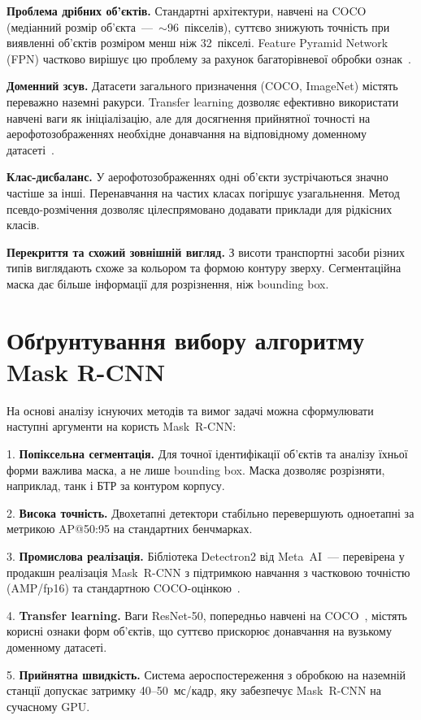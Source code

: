 \documentclass[14pt,a4paper]{extreport}
\begin{document}
\textbf{Проблема дрібних об'єктів.} Стандартні архітектури, навчені на
COCO (медіанний розмір об'єкта~---~$\sim$96~пікселів), суттєво знижують
точність при виявленні об'єктів розміром менш ніж 32~пікселі. Feature
Pyramid Network (FPN) частково вирішує цю проблему за рахунок
багаторівневої обробки ознак~\cite{fpn2017}.

\textbf{Доменний зсув.} Датасети загального призначення (COCO,
ImageNet) містять переважно наземні ракурси. Transfer learning
дозволяє ефективно використати навчені ваги як ініціалізацію,
але для досягнення прийнятної точності на аерофотозображеннях
необхідне донавчання на відповідному доменному датасеті~\cite{avolaMS2021}.

\textbf{Клас-дисбаланс.} У аерофотозображеннях одні об'єкти зустрічаються
значно частіше за інші. Перенавчання на частих класах погіршує
узагальнення. Метод псевдо-розмічення дозволяє цілеспрямовано додавати
приклади для рідкісних класів.

\textbf{Перекриття та схожий зовнішній вигляд.} З висоти транспортні
засоби різних типів виглядають схоже за кольором та формою контуру
зверху. Сегментаційна маска дає більше інформації для розрізнення, ніж
bounding box.

\section{Обґрунтування вибору алгоритму Mask R-CNN}

На основі аналізу існуючих методів та вимог задачі можна сформулювати
наступні аргументи на користь Mask~R-CNN:

1. \textbf{Попіксельна сегментація.} Для точної ідентифікації об'єктів
та аналізу їхньої форми важлива маска, а не лише bounding box. Маска
дозволяє розрізняти, наприклад, танк і БТР за контуром корпусу.

2. \textbf{Висока точність.} Двохетапні детектори стабільно перевершують
одноетапні за метрикою AP@50:95 на стандартних бенчмарках.

3. \textbf{Промислова реалізація.} Бібліотека Detectron2 від Meta~AI~---
перевірена у продакшн реалізація Mask~R-CNN з підтримкою навчання з
частковою точністю (AMP/fp16) та стандартною COCO-оцінкою~\cite{detectron2}.

4. \textbf{Transfer learning.} Ваги ResNet-50, попередньо навчені на
COCO~\cite{resnet2016}, містять корисні ознаки форм об'єктів, що суттєво
прискорює донавчання на вузькому доменному датасеті.

5. \textbf{Прийнятна швидкість.} Система аероспостереження з обробкою
на наземній станції допускає затримку 40--50~мс/кадр, яку забезпечує
Mask~R-CNN на сучасному GPU.
\end{document}
